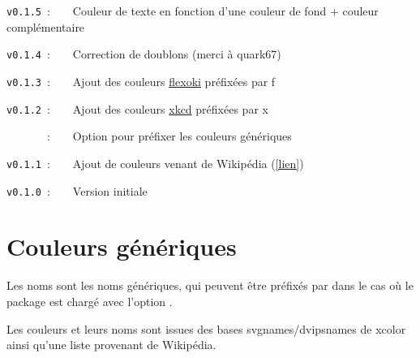 \documentclass[french,11pt,a4paper]{article}
\begin{document}
\verb|v0.1.5|~:~~~~Couleur de texte en fonction d'une couleur de fond + couleur complémentaire

\verb|v0.1.4|~:~~~~Correction de doublons (merci à \textsf{quark67})

\verb|v0.1.3|~:~~~~Ajout des couleurs \href{https://stephango.com/flexoki}{flexoki} préfixées par \textsf{f}

\verb|v0.1.2|~:~~~~Ajout des couleurs \href{https://xkcd.com/color/rgb.txt}{xkcd} préfixées par \textsf{x}

\verb|      |~:~~~~Option pour préfixer les couleurs génériques

\verb|v0.1.1|~:~~~~Ajout de couleurs venant de Wikipédia (\href{https://fr.wikipedia.org/wiki/Liste_de_noms_de_couleur}{[lien]})

\verb|v0.1.0|~:~~~~Version initiale

\pagebreak

\section{Couleurs génériques}

Les noms sont les noms génériques, qui peuvent être préfixés par  dans le cas où le package est chargé avec l'option \MontreCode{[Prefixe]}.

\smallskip

Les couleurs et leurs noms sont issues des bases \textsf{svgnames/dvipsnames} de \textsf{xcolor} ainsi qu'une liste provenant de \textsf{Wikipédia}.
%
\end{document}
